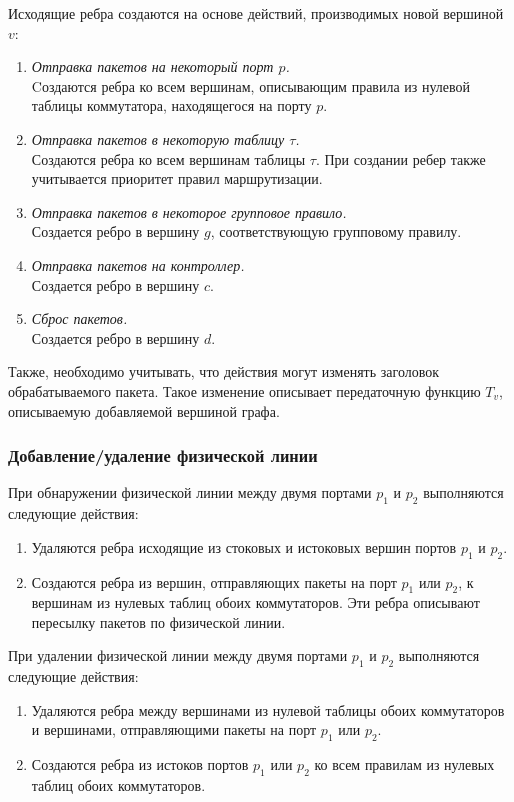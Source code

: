 \documentclass[../thesis.tex]{subfiles}
\begin{document}
Исходящие ребра создаются на основе действий, производимых новой вершиной $v$:
\begin{enumerate}
\item \textit{Отправка пакетов на некоторый порт $p$.}\\
Cоздаются ребра ко всем вершинам, описывающим правила из нулевой таблицы коммутатора, находящегося на порту $p$.
\item \textit{Отправка пакетов в некоторую таблицу $\tau$.}\\
Создаются ребра ко всем вершинам таблицы $\tau$. При создании ребер также учитывается приоритет правил маршрутизации.
\item \textit{Отправка пакетов в некоторое групповое правило.}\\
Создается ребро в вершину $g$, соответствующую групповому правилу.
\item \textit{Отправка пакетов на контроллер.}\\
Создается ребро в вершину $c$.
\item \textit{Сброс пакетов.}\\
Создается ребро в вершину $d$.
\end{enumerate}

Также, необходимо учитывать, что действия могут изменять заголовок обрабатываемого пакета.
Такое изменение описывает передаточную функцию $T_v$, описываемую добавляемой вершиной графа.

\subsubsection{Добавление/удаление физической линии}

При обнаружении физической линии между двумя портами $p_1$ и $p_2$ выполняются следующие действия:
\begin{enumerate}
\item Удаляются ребра исходящие из стоковых и истоковых вершин портов $p_1$ и $p_2$.
\item Создаются ребра из вершин, отправляющих пакеты на порт $p_1$ или $p_2$, к вершинам из нулевых таблиц обоих коммутаторов. Эти ребра описывают пересылку пакетов по физической линии.
\end{enumerate}

При удалении физической линии между двумя портами $p_1$ и $p_2$ выполняются следующие действия:
\begin{enumerate}
\item Удаляются ребра между вершинами из нулевой таблицы обоих коммутаторов и вершинами, отправляющими пакеты на порт $p_1$ или $p_2$.
\item Создаются ребра из истоков портов $p_1$ или $p_2$ ко всем правилам из нулевых таблиц обоих коммутаторов.
\end{enumerate}
\end{document}

